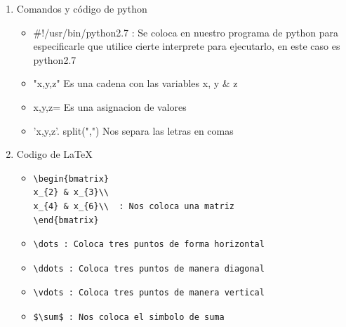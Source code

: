 \documentclass[letterpaper, 12pt, oneside]{article}%
\begin{document}
\begin{enumerate}
\begin{itemize}
			
		\end{itemize}%
	\newpage
		\item Comandos y código de python
		\begin{itemize}
			\item \#!/usr/bin/python2.7  : Se coloca en nuestro programa de python para especificarle que utilice cierte interprete para ejecutarlo, en este caso es python2.7
			\item "x,y,z" Es una cadena con las variables x, y \& z
			\item x,y,z= Es una asignacion de valores
			\item 'x,y,z'. split(",") Nos separa las letras en comas
		\end{itemize}
	\item Codigo de \LaTeX
		\begin{itemize}
			\item 
				\begin{lstlisting}
\begin{bmatrix}
x_{2} & x_{3}\\
x_{4} & x_{6}\\  : Nos coloca una matriz
\end{bmatrix}
				\end{lstlisting}
			\item 
				\begin{lstlisting}
\dots : Coloca tres puntos de forma horizontal
				\end{lstlisting}
			\item 
				\begin{lstlisting}
\ddots : Coloca tres puntos de manera diagonal
				\end{lstlisting}
			\item 
				\begin{lstlisting}
\vdots : Coloca tres puntos de manera vertical
				\end{lstlisting}
			
			
			\item 
			\begin{lstlisting}
$\sum$ : Nos coloca el simbolo de suma
			\end{lstlisting}
						
		
		\end{itemize}	
		
		
		
		
	\end{enumerate}%
	
	
	
\end{document}
